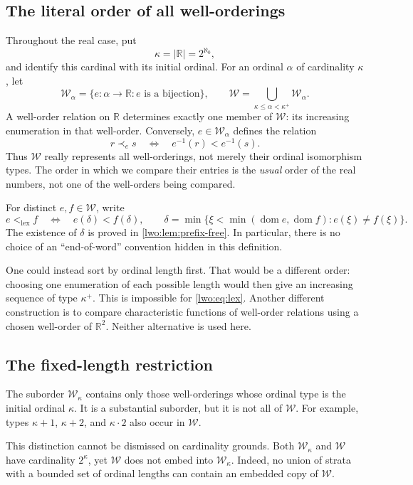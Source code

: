 \documentclass[11pt,a4paper]{article}
\theoremstyle{definition}
\theoremstyle{remark}
\newcommand{\R}{\mathbb R}
\newcommand{\W}{\mathcal W}
\newcommand{\lex}{\mathrm{lex}}
\newcommand{\dom}{\operatorname{dom}}
\begin{document}
\subsection{The literal order of all well-orderings}
Throughout the real case, put
\[
                 \kappa=|\R|=2^{\aleph_0},
\]
and identify this cardinal with its initial ordinal. For an ordinal $\alpha$
of cardinality $\kappa$, let
\[
 \W_\alpha=\{e:\alpha\longrightarrow\R:e\text{ is a bijection}\},
 \qquad
 \W=\bigcup_{\kappa\leq\alpha<\kappa^+}\W_\alpha.
\]
A well-order relation on $\R$ determines exactly one member of $\W$: its
increasing enumeration in that well-order. Conversely, $e\in\W_\alpha$
defines the relation
\[
       r\mathrel{\prec_e}s\quad\Longleftrightarrow\quad e^{-1}(r)<e^{-1}(s).
\]
Thus $\W$ really represents all well-orderings, not merely their ordinal
isomorphism types. The order in which we compare their entries is the
\emph{usual} order of the real numbers, not one of the well-orders being
compared.

For distinct $e,f\in\W$, write
\begin{equation}\label{lwo:eq:lex}
 e<_{\lex}f
 \quad\Longleftrightarrow\quad
 e(\delta)<f(\delta),\qquad
 \delta=\min\{\xi<\min(\dom e,\dom f):e(\xi)\ne f(\xi)\}.
\end{equation}
The existence of $\delta$ is proved in \cref{lwo:lem:prefix-free}. In particular,
there is no choice of an ``end-of-word'' convention hidden in this definition.

One could instead sort by ordinal length first. That would be a different
order: choosing one enumeration of each possible length would then give an
increasing sequence of type $\kappa^+$. This is impossible for
\eqref{lwo:eq:lex}. Another different construction is to compare characteristic
functions of well-order relations using a chosen well-order of $\R^2$.
Neither alternative is used here.

\subsection{The fixed-length restriction}
The suborder $\W_\kappa$ contains only those well-orderings whose ordinal type
is the initial ordinal $\kappa$. It is a substantial suborder, but it is not
all of $\W$. For example, types $\kappa+1$, $\kappa+2$, and
$\kappa\cdot2$ also occur in $\W$.

This distinction cannot be dismissed on cardinality grounds. Both
$\W_\kappa$ and $\W$ have cardinality $2^\kappa$, yet $\W$ does not embed
into $\W_\kappa$. Indeed, no union of strata with a bounded set of ordinal
lengths can contain an embedded copy of $\W$.
\end{document}
